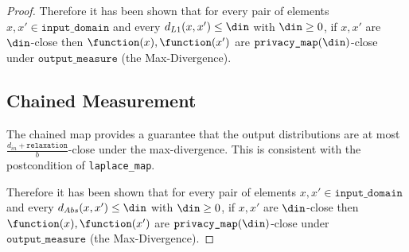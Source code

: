 \documentclass{article}
\begin{document}
\begin{proof}
Therefore it has been shown that for every pair of elements $x, x' \in \texttt{input\_domain}$ and every $d_{L1}(x, x') \le \din$ with $\din \ge 0$, 
if $x, x'$ are $\din$-close then $\function(x),\function(x')$ are $\texttt{privacy\_map}(\din)$-close under $\texttt{output\_measure}$ (the Max-Divergence).

\subsection{Chained Measurement}
The chained map provides a guarantee that the output distributions are at most $\frac{d_{in} + \texttt{relaxation}}{b}$-close under the max-divergence.
This is consistent with the postcondition of \texttt{laplace\_map}.

Therefore it has been shown that for every pair of elements $x, x' \in \texttt{input\_domain}$ and every $d_{Abs}(x, x') \le \din$ with $\din \ge 0$, 
if $x, x'$ are $\din$-close then $\function(x), \function(x')$ are $\texttt{privacy\_map}(\din)$-close under $\texttt{output\_measure}$ (the Max-Divergence).

\end{proof}
\end{document}
